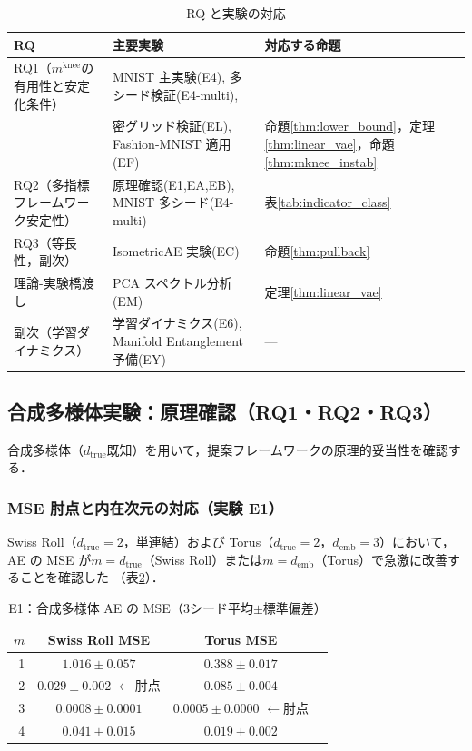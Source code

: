 \documentclass[11pt,a4paper]{jsarticle}
\newcommand{\dtrue}{d_{\mathrm{true}}}
\newcommand{\mknee}{m^{\mathrm{knee}}}
\newcommand{\demb}{d_{\mathrm{emb}}}
\begin{document}
\begin{table}[H]
\centering
\caption{RQ と実験の対応}
\label{tab:rq_exp_map}
\small
\begin{tabular}{lll}
\toprule
RQ & 主要実験 & 対応する命題 \\
\midrule
RQ1（$\mknee$の有用性と安定化条件） & MNIST 主実験(E4), 多シード検証(E4-multi), & \\
 & 密グリッド検証(EL), Fashion-MNIST 適用(EF) & 命題\ref{thm:lower_bound}，定理\ref{thm:linear_vae}，命題\ref{thm:mknee_instab} \\
RQ2（多指標フレームワーク安定性） & 原理確認(E1,EA,EB), MNIST 多シード(E4-multi) & 表\ref{tab:indicator_class} \\
RQ3（等長性，副次） & IsometricAE 実験(EC) & 命題\ref{thm:pullback} \\
理論-実験橋渡し & PCA スペクトル分析(EM) & 定理\ref{thm:linear_vae} \\
副次（学習ダイナミクス） & 学習ダイナミクス(E6), Manifold Entanglement 予備(EY) & --- \\
\bottomrule
\end{tabular}
\end{table}

\subsection{合成多様体実験：原理確認（RQ1・RQ2・RQ3）}\label{sec:exp_synthetic}

合成多様体（$\dtrue$既知）を用いて，提案フレームワークの原理的妥当性を確認する．

\subsubsection{MSE 肘点と内在次元の対応（実験 E1）}

Swiss Roll（$\dtrue = 2$，単連結）および Torus（$\dtrue = 2$，$\demb = 3$）において，
AE の MSE が$m = \dtrue$（Swiss Roll）または$m = \demb$（Torus）で急激に改善することを確認した
（表\ref{tab:e1}）．

\begin{table}[H]
\centering
\caption{E1：合成多様体 AE の MSE（3シード平均$\pm$標準偏差）}
\label{tab:e1}
\small
\begin{tabular}{rccc}
\toprule
$m$ & Swiss Roll MSE & Torus MSE \\
\midrule
1 & $1.016\pm0.057$ & $0.388\pm0.017$ \\
2 & $\boldsymbol{0.029\pm0.002}$ $\leftarrow$肘点 & $0.085\pm0.004$ \\
3 & $0.0008\pm0.0001$ & $\boldsymbol{0.0005\pm0.0000}$ $\leftarrow$肘点 \\
4 & $0.041\pm0.015$ & $0.019\pm0.002$ \\
\bottomrule
\end{tabular}
\end{table}
\end{document}
